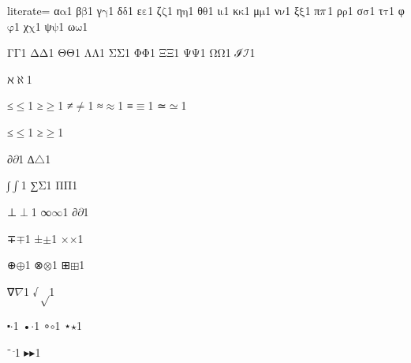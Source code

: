 {%
literate=
{α}{{\ensuremath{\mathrm{\alpha}}}}1
{β}{{\ensuremath{\mathrm{\beta}}}}1
{γ}{{\ensuremath{\mathrm{\gamma}}}}1
{δ}{{\ensuremath{\mathrm{\delta}}}}1
{ε}{{\ensuremath{\mathrm{\varepsilon}}}}1
{ζ}{{\ensuremath{\mathrm{\zeta}}}}1
{η}{{\ensuremath{\mathrm{\eta}}}}1
{θ}{{\ensuremath{\mathrm{\theta}}}}1
{ι}{{\ensuremath{\mathrm{\iota}}}}1
{κ}{{\ensuremath{\mathrm{\kappa}}}}1
{μ}{{\ensuremath{\mathrm{\mu}}}}1
{ν}{{\ensuremath{\mathrm{\nu}}}}1
{ξ}{{\ensuremath{\mathrm{\xi}}}}1
{π}{{\ensuremath{\mathrm{\mathnormal{\pi}}}}}1
{ρ}{{\ensuremath{\mathrm{\rho}}}}1
{σ}{{\ensuremath{\mathrm{\sigma}}}}1
{τ}{{\ensuremath{\mathrm{\tau}}}}1
{φ}{{\ensuremath{\mathrm{\varphi}}}}1
{χ}{{\ensuremath{\mathrm{\chi}}}}1
{ψ}{{\ensuremath{\mathrm{\psi}}}}1
{ω}{{\ensuremath{\mathrm{\omega}}}}1

{Γ}{{\ensuremath{\mathrm{\Gamma}}}}1
{Δ}{{\ensuremath{\mathrm{\Delta}}}}1
{Θ}{{\ensuremath{\mathrm{\Theta}}}}1
{Λ}{{\ensuremath{\mathrm{\Lambda}}}}1
{Σ}{{\ensuremath{\mathrm{\Sigma}}}}1
{Φ}{{\ensuremath{\mathrm{\Phi}}}}1
{Ξ}{{\ensuremath{\mathrm{\Xi}}}}1
{Ψ}{{\ensuremath{\mathrm{\Psi}}}}1
{Ω}{{\ensuremath{\mathrm{\Omega}}}}1
{ℐ}{{\ensuremath{{\mathrm{\mathscr{I}}}}}}1

{ℵ}{{\ensuremath{\aleph}}}1

{≤}{{\ensuremath{\leq}}}1
{≥}{{\ensuremath{\geq}}}1
{≠}{{\ensuremath{\neq}}}1
{≈}{{\ensuremath{\approx}}}1
{≡}{{\ensuremath{\equiv}}}1
{≃}{{\ensuremath{\simeq}}}1

{≤}{{\ensuremath{\leq}}}1
{≥}{{\ensuremath{\geq}}}1

{∂}{{\ensuremath{\partial}}}1
{∆}{{\ensuremath{\triangle}}}1 %

{∫}{{\ensuremath{\int}}}1
{∑}{{\ensuremath{\mathrm{\Sigma}}}}1
{Π}{{\ensuremath{\mathrm{\Pi}}}}1

{⊥}{{\ensuremath{\perp}}}1
{∞}{{\ensuremath{\infty}}}1
{∂}{{\ensuremath{\partial}}}1

{∓}{{\ensuremath{\mp}}}1
{±}{{\ensuremath{\pm}}}1
{×}{{\ensuremath{\times}}}1

{⊕}{{\ensuremath{\oplus}}}1
{⊗}{{\ensuremath{\otimes}}}1
{⊞}{{\ensuremath{\boxplus}}}1

{∇}{{\ensuremath{\nabla}}}1
{√}{{\ensuremath{\sqrt}}}1

{⬝}{{\ensuremath{\cdot}}}1
{•}{{\ensuremath{\cdot}}}1
{∘}{{\ensuremath{\circ}}}1
{⋆}{{\ensuremath{\star}}}1

{⁻}{{\ensuremath{^{\textup{\kern1pt\rule{2pt}{0.3pt}\kern-1pt}}}}}1
{▸}{{\ensuremath{\blacktriangleright}}}1

}
